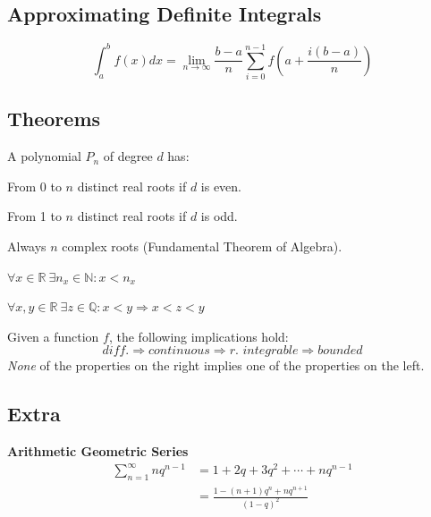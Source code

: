 \documentclass[8pt,a4paper]{extarticle}     %
\theoremstyle{definition}
\theoremstyle{definition}
\theoremstyle{definition}
\newcommand{\R}{\mathbb{R}}
\newcommand{\N}{\mathbb{N}}
\newcommand{\Q}{\mathbb{Q}}
\begin{document}
\begin{multicols}{4}
\subsection{Approximating Definite Integrals}
$$\int_a^b f(x)dx = \lim_{n\to\infty} \frac{b-a}{n}\sum_{i=0}^{n-1} f\left(a+\frac{i(b-a)}{n}\right)$$

\subsection{Theorems}
\begin{boxtheorem}
	A polynomial $P_n$ of degree $d$ has: 
	\begin{bulletlist}
		\item From 0 to $n$ distinct real roots if $d$ is even.
		\item From 1 to $n$ distinct real roots if $d$ is odd.
		\item Always $n$ complex roots (Fundamental Theorem of Algebra). 
	\end{bulletlist}
\end{boxtheorem}

\begin{boxtheorem}
	$\forall x\in\R \ \exists n_x\in\N: x < n_x$
\end{boxtheorem}

\begin{boxtheorem}
	$\forall x,y\in\R \ \exists z \in \Q: x<y \Rightarrow x<z<y$
\end{boxtheorem}

\begin{boxtheorem}
Given a function $f$, the following implications hold: 
$$\textit{diff.} \Rightarrow \textit{continuous} \Rightarrow \textit{r. integrable} \Rightarrow \textit{bounded}$$
\textit{None} of the properties on the right implies one of the properties on the left. 
\end{boxtheorem}

\subsection{Extra}
\textbf{Arithmetic Geometric Series}
\[
\begin{split}
	\sum_{n=1}^\infty nq^{n-1} &= 1+2q+3q^2+\cdots+nq^{n-1} \\
	&= \frac{1-(n+1)q^n+nq^{n+1}}{(1-q)^2}
\end{split}
\] 

\vfill\eject
\columnbreak


\end{multicols}
\end{document}
